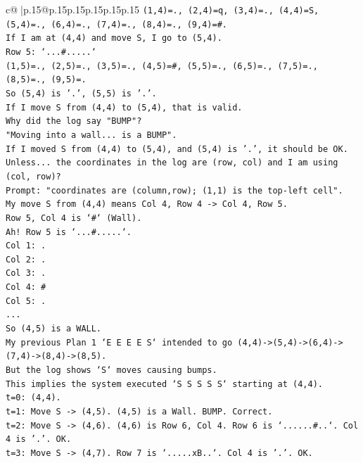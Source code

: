 \documentclass{article}
\begin{document}
{\begin{supertabular}{c@{$\;$}|p{.15\linewidth}@{}p{.15\linewidth}p{.15\linewidth}p{.15\linewidth}p{.15\linewidth}p{.15\linewidth}}
{{{\texttt{(1,4)=., (2,4)=q, (3,4)=., (4,4)=S, (5,4)=., (6,4)=., (7,4)=., (8,4)=., (9,4)=\#.} \\
\texttt{If I am at (4,4) and move S, I go to (5,4).} \\
\texttt{Row 5: `...\#.....`} \\
\texttt{(1,5)=., (2,5)=., (3,5)=., (4,5)=\#, (5,5)=., (6,5)=., (7,5)=., (8,5)=., (9,5)=.} \\
\texttt{So (5,4) is '.', (5,5) is '.'.} \\
\texttt{If I move S from (4,4) to (5,4), that is valid.} \\
\texttt{Why did the log say "BUMP"?} \\
\texttt{"Moving into a wall... is a BUMP".} \\
\texttt{If I moved S from (4,4) to (5,4), and (5,4) is '.', it should be OK.} \\
\texttt{Unless... the coordinates in the log are (row, col) and I am using (col, row)?} \\
\texttt{Prompt: "coordinates are (column,row); (1,1) is the top{-}left cell".} \\
\texttt{My move S from (4,4) means Col 4, Row 4 {-}> Col 4, Row 5.} \\
\texttt{Row 5, Col 4 is `\#` (Wall).} \\
\texttt{Ah! Row 5 is `...\#.....`.} \\
\texttt{Col 1: .} \\
\texttt{Col 2: .} \\
\texttt{Col 3: .} \\
\texttt{Col 4: \#} \\
\texttt{Col 5: .} \\
\texttt{...} \\
\texttt{So (4,5) is a WALL.} \\
\texttt{My previous Plan 1 `E E E E S` intended to go (4,4){-}>(5,4){-}>(6,4){-}>(7,4){-}>(8,4){-}>(8,5).} \\
\texttt{But the log shows `S` moves causing bumps.} \\
\texttt{This implies the system executed `S S S S S` starting at (4,4).} \\
\texttt{t=0: (4,4).} \\
\texttt{t=1: Move S {-}> (4,5). (4,5) is a Wall. BUMP. Correct.} \\
\texttt{t=2: Move S {-}> (4,6). (4,6) is Row 6, Col 4. Row 6 is `......\#..`. Col 4 is '.'. OK.} \\
\texttt{t=3: Move S {-}> (4,7). Row 7 is `.....xB..`. Col 4 is '.'. OK.} \\
}}}
\end{supertabular}}
\end{document}
